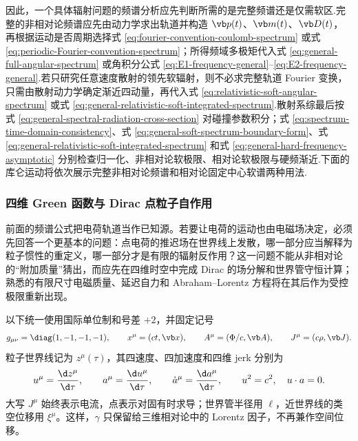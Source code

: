 因此，一个具体辐射问题的频谱分析应先判断所需的是完整频谱还是仅需软区.完整的非相对论频谱应先由动力学求出轨道并构造 $\vb p(t)$、$\vb m(t)$、$\vb D(t)$，再根据运动是否周期选择式 \eqref{eq:fourier-convention-coulomb-spectrum} 或式 \eqref{eq:periodic-Fourier-convention-spectrum}；所得频域多极矩代入式 \eqref{eq:general-full-angular-spectrum} 或角积分公式 \eqref{eq:E1-frequency-general}--\eqref{eq:E2-frequency-general}.若只研究任意速度散射的领先软辐射，则不必求完整轨道 Fourier 变换，只需由散射动力学确定渐近四动量，再代入式 \eqref{eq:relativistic-soft-angular-spectrum} 或式 \eqref{eq:general-relativistic-soft-integrated-spectrum}.散射系综最后按式 \eqref{eq:general-spectral-radiation-cross-section} 对碰撞参数积分；式 \eqref{eq:spectrum-time-domain-consistency}、式 \eqref{eq:general-soft-spectrum-boundary-form}、式 \eqref{eq:general-relativistic-soft-integrated-spectrum} 和式 \eqref{eq:general-hard-frequency-asymptotic} 分别检查归一化、非相对论软极限、相对论软极限与硬频渐近.下面的库仑运动将依次展示完整非相对论频谱和相对论固定中心软谱两种用法.


\subsubsection{四维 Green 函数与 Dirac 点粒子自作用}

前面的频谱公式把电荷轨道当作已知源。若要让电荷的运动也由电磁场决定，必须先回答一个更基本的问题：点电荷的推迟场在世界线上发散，哪一部分应当解释为粒子惯性的重定义，哪一部分才是有限的辐射反作用？这一问题不能从非相对论的“附加质量”猜出，而应先在四维时空中完成 Dirac 的场分解和世界管守恒计算；熟悉的有限尺寸电磁质量、延迟自力和 Abraham--Lorentz 方程将在其后作为受控极限重新出现。

以下统一使用国际单位制和号差 $+2$，并固定记号
\begin{equation}
 g_{\mu\nu}=\diag(1,-1,-1,-1),
 \qquad
 x^\mu=(ct,\vb x),
 \qquad
 A^\mu=(\Phi/c,\vb A),
 \qquad
 J^\mu=(c\rho,\vb J).
 \label{eq:dirac-first-notation-fields}
\end{equation}
粒子世界线记为 $z^\mu(\tau)$，其四速度、四加速度和四维 jerk 分别为
\begin{equation}
 u^\mu={\d z^\mu\over\d\tau},
 \qquad
 a^\mu={\d u^\mu\over\d\tau},
 \qquad
 \dot a^\mu={\d a^\mu\over\d\tau},
 \qquad
 u^2=c^2,
 \quad u\cdot a=0.
 \label{eq:dirac-first-notation-kinematics}
\end{equation}
大写 $J^\mu$ 始终表示电流，点表示对固有时求导；世界管半径用 $\ell$，近世界线的类空位移用 $\xi^\mu$。这样，$\gamma$ 只保留给三维相对论中的 Lorentz 因子，不再兼作空间位移。


